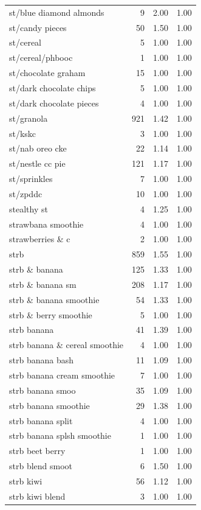 \begin{table}
\begin{tabular}{lrrr}
st/blue diamond almonds & 9 & 2.00 & 1.00 \\
st/candy pieces & 50 & 1.50 & 1.00 \\
st/cereal & 5 & 1.00 & 1.00 \\
st/cereal/phbooc & 1 & 1.00 & 1.00 \\
st/chocolate graham & 15 & 1.00 & 1.00 \\
st/dark chocolate chips & 5 & 1.00 & 1.00 \\
st/dark chocolate pieces & 4 & 1.00 & 1.00 \\
st/granola & 921 & 1.42 & 1.00 \\
st/kskc & 3 & 1.00 & 1.00 \\
st/nab oreo cke & 22 & 1.14 & 1.00 \\
st/nestle cc pie & 121 & 1.17 & 1.00 \\
st/sprinkles & 7 & 1.00 & 1.00 \\
st/zpddc & 10 & 1.00 & 1.00 \\
stealthy st & 4 & 1.25 & 1.00 \\
strawbana smoothie & 4 & 1.00 & 1.00 \\
strawberries \& c & 2 & 1.00 & 1.00 \\
strb & 859 & 1.55 & 1.00 \\
strb \& banana & 125 & 1.33 & 1.00 \\
strb \& banana sm & 208 & 1.17 & 1.00 \\
strb \& banana smoothie & 54 & 1.33 & 1.00 \\
strb \& berry smoothie & 5 & 1.00 & 1.00 \\
strb banana & 41 & 1.39 & 1.00 \\
strb banana \& cereal smoothie & 4 & 1.00 & 1.00 \\
strb banana bash & 11 & 1.09 & 1.00 \\
strb banana cream smoothie & 7 & 1.00 & 1.00 \\
strb banana smoo & 35 & 1.09 & 1.00 \\
strb banana smoothie & 29 & 1.38 & 1.00 \\
strb banana split & 4 & 1.00 & 1.00 \\
strb banana splsh smoothie & 1 & 1.00 & 1.00 \\
strb beet berry & 1 & 1.00 & 1.00 \\
strb blend smoot & 6 & 1.50 & 1.00 \\
strb kiwi & 56 & 1.12 & 1.00 \\
strb kiwi blend & 3 & 1.00 & 1.00 \\

\end{tabular}
\end{table}
